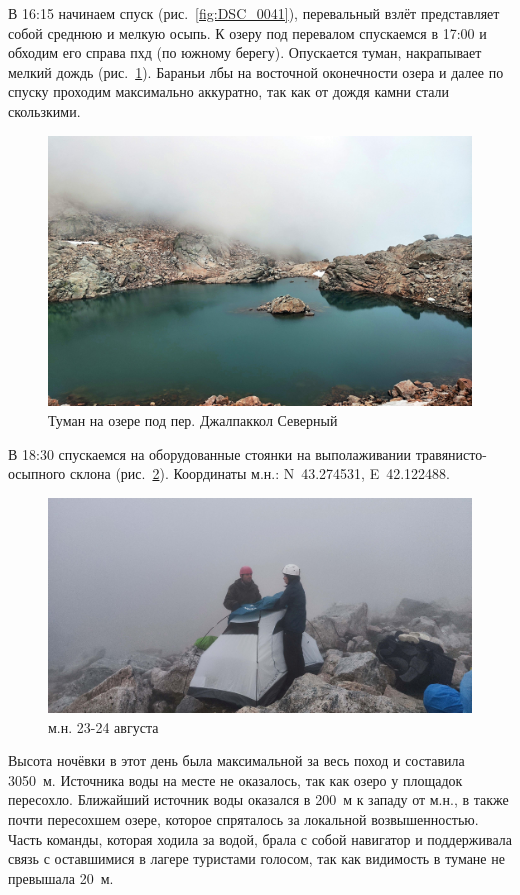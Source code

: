 В 16:15 начинаем спуск (рис.~\ref{fig:DSC_0041}), перевальный взлёт представляет собой среднюю и мелкую осыпь. К озеру под перевалом спускаемся в 17:00 и обходим его справа пхд (по южному берегу). Опускается туман, накрапывает мелкий дождь (рис.~\ref{fig:IMG_20240823_170306}). Бараньи лбы на восточной оконечности озера и далее по спуску проходим максимально аккуратно, так как от дождя камни стали скользкими.
 
\begin{figure}[h!]	
	\centering
	\includegraphics[angle=0, width=0.7\linewidth]{../pics/IMG_20240823_170306}
	\caption{Туман на озере под пер. Джалпаккол Северный}
	\label{fig:IMG_20240823_170306}
\end{figure}

В 18:30 спускаемся на оборудованные стоянки на выполаживании травянисто-осыпного склона (рис.~\ref{fig:IMG_20240823_184041}). Координаты м.н.: N~43.274531\degree, E~42.122488\degree.

\begin{figure}[h]	
	\centering
	\includegraphics[angle=0, width=0.7\linewidth]{../pics/IMG_20240823_184041}
	\caption{м.н. 23-24 августа}
	\label{fig:IMG_20240823_184041}
\end{figure}

 Высота ночёвки в этот день была максимальной за весь поход и составила 3050~м. Источника воды на месте не оказалось, так как озеро у площадок пересохло. Ближайший источник воды оказался в 200~м к западу от м.н., в также почти пересохшем озере, которое спряталось за локальной возвышенностью. Часть команды, которая ходила за водой, брала с собой навигатор и поддерживала связь с оставшимися в лагере туристами голосом, так как видимость в тумане не превышала 20~м.




